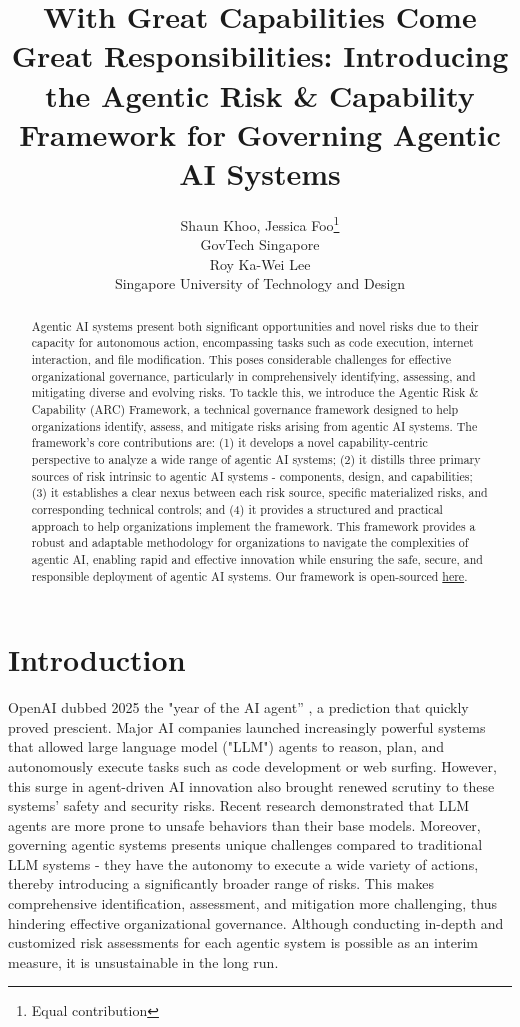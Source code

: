 \documentclass{article}
\title{With Great Capabilities Come Great Responsibilities: Introducing the Agentic Risk \& Capability Framework for Governing Agentic AI Systems}
\author{
  Shaun Khoo, Jessica Foo\thanks{Equal contribution} \\
  GovTech Singapore\\
  \And
  Roy Ka-Wei Lee\\
  Singapore University of Technology and Design
}
\begin{document}
\maketitle
\typeout{}

\begin{abstract}
Agentic AI systems present both significant opportunities and novel risks due to their capacity for autonomous action, encompassing tasks such as code execution, internet interaction, and file modification. This poses considerable challenges for effective organizational governance, particularly in comprehensively identifying, assessing, and mitigating diverse and evolving risks. To tackle this, we introduce the Agentic Risk \& Capability (ARC) Framework, a technical governance framework designed to help organizations identify, assess, and mitigate risks arising from agentic AI systems. The framework's core contributions are: (1) it develops a novel capability-centric perspective to analyze a wide range of agentic AI systems; (2) it distills three primary sources of risk intrinsic to agentic AI systems - components, design, and capabilities; (3) it establishes a clear nexus between each risk source, specific materialized risks, and corresponding technical controls; and (4) it provides a structured and practical approach to help organizations implement the framework. This framework provides a robust and adaptable methodology for organizations to navigate the complexities of agentic AI, enabling rapid and effective innovation while ensuring the safe, secure, and responsible deployment of agentic AI systems. Our framework is open-sourced \href{https://govtech-responsibleai.github.io/agentic-risk-capability-framework/}{here}.
\end{abstract}

\section{Introduction}

OpenAI dubbed 2025 the "year of the AI agent” \citep{hamilton2025_agents}, a prediction that quickly proved prescient. Major AI companies launched increasingly powerful systems that allowed large language model ("LLM") agents to reason, plan, and autonomously execute tasks such as code development or web surfing. However, this surge in agent-driven AI innovation also brought renewed scrutiny to these systems' safety and security risks. Recent research \citep{chiang2025_harmful, kumar2025_aligned, yu2025_safety} demonstrated that LLM agents are more prone to unsafe behaviors than their base models. Moreover, governing agentic systems presents unique challenges compared to traditional LLM systems - they have the autonomy to execute a wide variety of actions, thereby introducing a significantly broader range of risks. This makes comprehensive identification, assessment, and mitigation more challenging, thus hindering effective organizational governance. Although conducting in-depth and customized risk assessments for each agentic system is possible as an interim measure, it is unsustainable in the long run.
\end{document}

